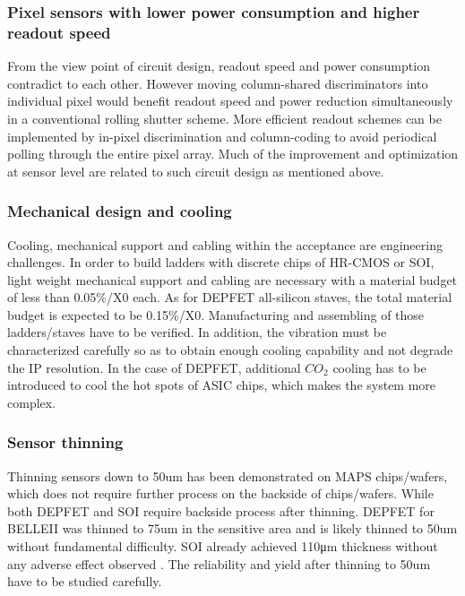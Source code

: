 \subsubsection{Pixel sensors with lower power consumption and higher readout speed}

From the view point of circuit design, readout speed and power consumption contradict to each other. However moving column-shared discriminators into individual pixel would benefit readout speed and power reduction simultaneously in a conventional rolling shutter scheme. More efficient readout schemes can be implemented by in-pixel discrimination and column-coding to avoid periodical polling through the entire pixel array. Much of the improvement and optimization at sensor level are related to such circuit design as mentioned above.

\subsubsection{Mechanical design and cooling}

Cooling, mechanical support and cabling within the acceptance are engineering challenges. In order to build ladders with discrete chips of HR-CMOS or SOI, light weight mechanical support and cabling are necessary with a material budget of less than 0.05\%/X0 each. As for DEPFET all-silicon staves, the total material budget is expected to be 0.15\%/X0. Manufacturing and assembling of those ladders/staves have to be verified. In addition, the vibration must be characterized carefully so as to obtain enough cooling capability and not degrade the IP resolution. In the case of DEPFET, additional $CO_{2}$ cooling has to be introduced to cool the hot spots of ASIC chips, which makes the system more complex.

\subsubsection{Sensor thinning}

Thinning sensors down to 50um has been demonstrated on MAPS chips/wafers, which does not require further process on the backside of chips/wafers. While both DEPFET and SOI require backside process after thinning. DEPFET for BELLEII was thinned to 75um in the sensitive area \cite{lacasta2014depfet} and is likely thinned to 50um without fundamental difficulty. SOI already achieved 110μm thickness without any adverse effect observed  \cite{xx18}. The reliability and yield after thinning to 50um have to be studied carefully.

